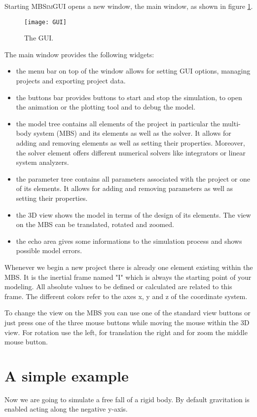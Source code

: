 \documentclass[
a4paper,
fleqn,
DIV=15,
pagesize
]{scrartcl}
\begin{document}
Starting \textsc{MBSimGUI} opens a new window, the main window, as shown in figure \ref{GUI}.
\begin{figure}
\centering
\texttt{[image: GUI]}
\caption{The GUI.} \label{GUI}
\end{figure}
The main window provides the following widgets:
\begin{itemize}
  \item the menu bar on top of the window allows for setting GUI options, managing
  projects and exporting project data.
  \item the buttons bar provides buttons to start and stop the simulation, to open
  the animation or the plotting tool and to debug the model.
  \item the model tree contains all elements of the project in particular the multi-body system (MBS) and its elements as well as the solver.
  It allows for adding and removing elements as well as setting their properties. Moreover, the solver element offers different numerical solvers like integrators or
  linear system analyzers.
  \item the parameter tree contains all parameters associated with the project or one of its elements. It allows for adding and removing parameters as well as setting their properties.
  \item the 3D view shows the model in terms of the design of its elements. The view on the MBS can be translated, rotated and zoomed.
  \item the echo area gives some informations to the simulation process and shows possible model errors.
\end{itemize}

Whenever we begin a new project there is already one element existing within the MBS. It is the inertial frame named
"I" which is always the starting point of your modeling. All absolute values to
be defined or calculated are related to this frame. The different colors refer
to the axes {\color{red} x}, {\color{green} y} and {\color{blue} z} of the
coordinate system.

To change the view on the MBS you can use one of the standard view buttons or
just press one of the three mouse buttons while moving the mouse within the 3D
view. For rotation use the left, for translation the right and for zoom the
middle mouse button.

\section{A simple example}
Now we are going to simulate a free fall of a rigid body. By default gravitation is enabled
acting along the negative {\color{green}y-axis}.
\end{document}
